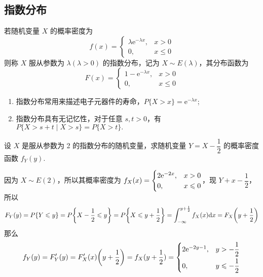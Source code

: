 \subsection{指数分布}

\begin{definition}[指数分布]
    若随机变量 $ X $ 的概率密度为
    $$f(x)=\begin{cases}
            \lambda \mathrm{e}^{-\lambda x}, & x>0           \\
            0,                               & x \leqslant 0
        \end{cases}$$
    则称 $ X $ 服从参数为 $ \lambda(\lambda>0) $ 的指数分布，记为 $ X \sim E(\lambda) $，其分布函数为
    $$F(x)=\begin{cases}
            1-\mathrm{e}^{-\lambda x}, & x>0           \\
            0,                         & x \leqslant 0
        \end{cases}$$
    \begin{enumerate}[label=(\arabic{*})]
        \item 指数分布常用来描述电子元器件的寿命，$P\{X>x\}=\mathrm{e}^{-\lambda x} $;
        \item 指数分布具有无记忆性，对于任意 $ s, t>0$，有 $P\{X>s+t \mid X>s\}=P\{X>t\} .$
    \end{enumerate}
\end{definition}

\begin{example}
    设 $X$ 是服从参数为 2 的指数分布的随机变量，求随机变量 $Y=X-\dfrac{1}{2}$ 的概率密度函数 $f_Y(y).$
\end{example}
\begin{solution}
    因为 $X\sim E(2)$，所以其概率密度为 $f_X(x)=\begin{cases}
            2\mathrm{e}^{-2x}, & x>0          \\
            0,         & x\leqslant 0
        \end{cases}$，现 $Y+x-\dfrac{1}{2}$，所以 $$F_Y(y)=P\qty{Y\leqslant y}=P\qty{X-\dfrac{1}{2}\leqslant y}=P\qty{X\leqslant y+\dfrac{1}{2}}=\int_{-\infty}^{y+\frac{1}{2}}f_X(x)\dd x=F_X\qty(y+\dfrac{1}{2})$$
    那么 $$f_Y(y)=F'_Y(y)=F'_X(x)\qty(y+\dfrac{1}{2})=f_X(y+\dfrac{1}{2})=\begin{cases}
            2\mathrm{e}^{-2y-1}, & y>-\dfrac{1}{2}          \\[6pt]
            0,           & y\leqslant -\dfrac{1}{2}
        \end{cases}$$
\end{solution}

